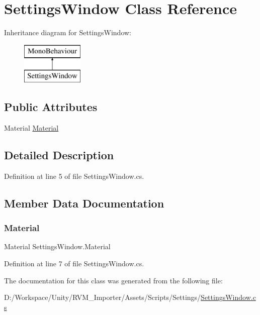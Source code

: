 \hypertarget{class_settings_window}{}\section{Settings\+Window Class Reference}
\label{class_settings_window}
Inheritance diagram for Settings\+Window\+:\begin{figure}[H]
\begin{center}
\leavevmode
\includegraphics[height=2.000000cm]{class_settings_window}
\end{center}
\end{figure}
\subsection*{Public Attributes}
\begin{DoxyCompactItemize}
\item 
Material \mbox{\hyperlink{class_settings_window_aed24c62328169b35cb4952858b9d9725}{Material}}
\end{DoxyCompactItemize}


\subsection{Detailed Description}


Definition at line 5 of file Settings\+Window.\+cs.



\subsection{Member Data Documentation}
\mbox{\label{class_settings_window_aed24c62328169b35cb4952858b9d9725}} 
\subsubsection{\texorpdfstring{Material}{Material}}
{\footnotesize\ttfamily Material Settings\+Window.\+Material}



Definition at line 7 of file Settings\+Window.\+cs.



The documentation for this class was generated from the following file\+:\begin{DoxyCompactItemize}
\item 
D\+:/\+Workspace/\+Unity/\+R\+V\+M\+\_\+\+Importer/\+Assets/\+Scripts/\+Settings/\mbox{\hyperlink{_settings_window_8cs}{Settings\+Window.\+cs}}\end{DoxyCompactItemize}
